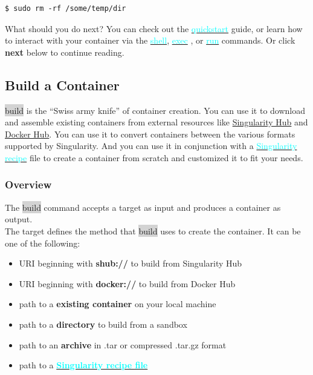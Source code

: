 \documentclass[a4paper]{article}
\begin{document}
\begin{lstlisting}[frame=single] 
$ sudo rm -rf /some/temp/dir
\end{lstlisting}

What should you do next? You can check out the \hyperref[sec:quickstart]{{\textcolor{cyan}{quickstart}}}  guide, or learn how to interact with your container via the \hyperref[sec:shell]{{\textcolor{cyan}{shell}}}, \hyperref[sec:exec]{{\textcolor{cyan}{exec}}} , or \hyperref[sec:run]{{\textcolor{cyan}{run}}}  commands. Or click \textbf{next} below to continue reading.

\subsection{Build a Container}
\label{sec:buildcontainer}

\colorbox{lightgray}{build} is the “Swiss army knife” of container creation. You can use it to download and assemble existing containers from external resources like \href{https://singularity-hub.org/}{Singularity Hub} and \href{https://hub.docker.com/}{Docker Hub}. You can use it to convert containers between the various formats supported by Singularity. And you can use it in conjunction with a \hyperref[sec:recipefile]{{\textcolor{cyan}{Singularity recipe}}} file to create a container from scratch and customized it to fit your needs.

\subsubsection{Overview}

The \colorbox{lightgray}{build} command accepts a target as input and produces a container as output.\\

The target defines the method that \colorbox{lightgray}{build} uses to create the container. It can be one of the following:\\

\begin{itemize}
\item URI beginning with \textbf{shub://} to build from Singularity Hub
\item URI beginning with \textbf{docker://} to build from Docker Hub
\item path to a \textbf{existing container} on your local machine
\item path to a \textbf{directory} to build from a sandbox
\item path to an \textbf{archive} in .tar or compressed .tar.gz format
\item path to a \textbf{\hyperref[sec:recipefile]{{\textcolor{cyan}{Singularity recipe file}}}}
\end{itemize}
\end{document}
